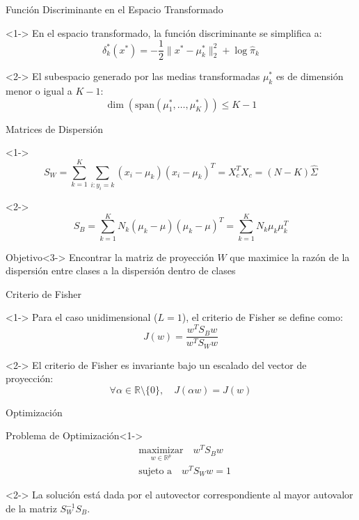 \documentclass[spanish,handout]{beamer}
\begin{document}
\begin{frame}{Función Discriminante en el Espacio Transformado}
\begin{definition}<1->
En el espacio transformado, la función discriminante se simplifica a:
\[
\delta_k^*(x^*) = -\frac{1}{2}\|x^* - \mu_k^*\|_2^2 + \log \hat{\pi}_k
\]
\end{definition}

\begin{theorem}<2->
El subespacio generado por las medias transformadas $\mu_k^*$ es de dimensión menor o igual a $K-1$:
\[
\dim(\mathrm{span}(\mu_1^*, \ldots, \mu_K^*)) \leq K-1
\]
\end{theorem}
\end{frame}

\begin{frame}{Matrices de Dispersión}
\begin{definition}<1->
\[
S_W = \sum_{k=1}^K \sum_{i: y_i = k} (x_i - \mu_k)(x_i - \mu_k)^T = X_c^T X_c = (N - K) \hat{\Sigma}
\]
\end{definition}

\begin{definition}<2->
\[
S_B = \sum_{k=1}^K N_k (\mu_k - \mu)(\mu_k - \mu)^T = \sum_{k=1}^K N_k \mu_k \mu_k^T
\]
\end{definition}

\begin{block}{Objetivo}<3->
Encontrar la matriz de proyección $W$ que maximice la razón de la dispersión entre clases a la dispersión dentro de clases
\end{block}
\end{frame}

\begin{frame}{Criterio de Fisher}
\begin{definition}<1->
Para el caso unidimensional ($L=1$), el criterio de Fisher se define como:
\[
J(w) = \frac{w^T S_B w}{w^T S_W w}
\]
\end{definition}

\begin{theorem}<2->
El criterio de Fisher es invariante bajo un escalado del vector de proyección:
\[
\forall \alpha \in \mathbb{R} \setminus \{0\}, \quad J(\alpha w) = J(w)
\]
\end{theorem}
\end{frame}

\begin{frame}{Optimización}
\begin{block}{Problema de Optimización}<1->
\begin{align*}
& \underset{w \in \mathbb{R}^p}{\mathrm{maximizar}} \quad w^T S_B w \\
& \text{sujeto a} \quad w^T S_W w = 1
\end{align*}
\end{block}

\begin{theorem}<2->
La solución está dada por el autovector correspondiente al mayor autovalor de la matriz $S_W^{-1} S_B$.
\end{theorem}
\end{frame}
\end{document}
